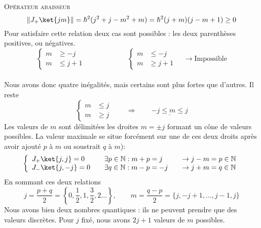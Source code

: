 	
	\textsc{Opérateur abaisseur}
	\begin{equation}
	\|J_+\ket{jm}\| = \hbar^2(j^2+j-m^2+m) = \hbar^2(j+m)(j-m+1)\geq 0
	\end{equation}
	Pour satisfaire cette relation deux cas sont possibles : les deux parenthèses positives, ou négatives.
	\begin{equation}
	\left\{\begin{array}{ll}
	m &\geq -j\\
	m &\leq j+1
	\end{array}\right.\qquad\qquad\qquad		\left\{\begin{array}{ll}
	m &\leq -j\\
	m &\geq j+1
	\end{array}\right.\quad\rightarrow \text{Impossible}
	\end{equation}\ \\
	
	Nous avons donc quatre inégalités, mais certains sont plus fortes que d'autres. Il reste
	\begin{equation}
	\left\{\begin{array}{ll}
	m &\leq j\\
	m &\geq j
	\end{array}\right.\qquad\Longrightarrow\qquad \underline{-j\leq m\leq j}
	\end{equation}
	Les valeurs de $m$ sont délimitées les droites $m=\pm j$ formant un cône de valeurs possibles. 
	La valeur maximale se situe forcément sur une de ces deux droits après avoir ajouté $p$ à $m$ 
	ou soustrait $q$ à $m$):
	\begin{equation}
	\left\{\begin{array}{llll}
	J_+\ket{j,j} = 0 & \quad \exists p\in\mathbb{N} : m+p=j &\quad \rightarrow j-m=p\in\mathbb{N}\\
	J_-\ket{j,-j} = 0 & \quad \exists q\in\mathbb{N} : m-p=-j &\quad \rightarrow j+m=q\in\mathbb{N}	
	\end{array}\right.
	\end{equation}
	En sommant ces deux relations
	\begin{equation}
	j = \frac{p+q}{2} = \left\{0,\frac{1}{2},1,\frac{3}{2},2\dots\right\},\qquad
	m = \frac{q-p}{2} = \{j,-j+1,\dots, j-1,j\}
	\end{equation}
	Nous avons bien deux nombres quantiques : ils ne peuvent prendre que des valeurs discrètes. Pour
	$j$ fixé, nous avons $2j+1$ valeurs de $m$ possibles. \\
	
